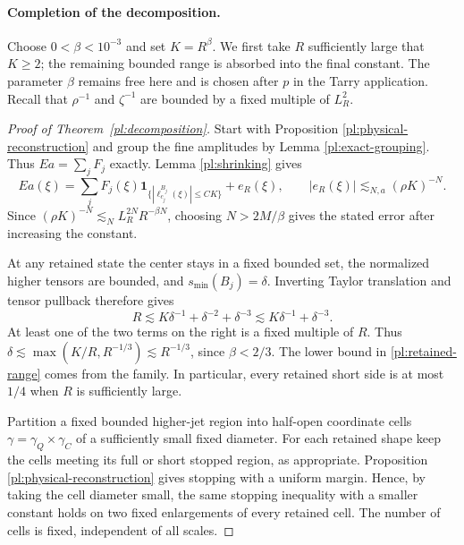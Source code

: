 \documentclass[11pt]{amsart}
\theoremstyle{definition}
\theoremstyle{remark}
\numberwithin{equation}{section}
\begin{document}
\paragraph{Completion of the decomposition.}
\label{pl:resolution-proof}

Choose $0<\beta<10^{-3}$ and set $K=R^\beta$. We first take $R$ sufficiently large that $K\ge2$; the remaining bounded range is absorbed into the final constant. The parameter $\beta$ remains free here and is chosen after $p$ in the Tarry application. Recall that $\rho^{-1}$ and $\zeta^{-1}$ are bounded by a fixed multiple of $L_R^2$.

\begin{proof}[Proof of Theorem~\ref{pl:decomposition}]
Start with Proposition \ref{pl:physical-reconstruction} and group the fine amplitudes by Lemma \ref{pl:exact-grouping}. Thus $Ea=\sum_jF_j$ exactly. Lemma \ref{pl:shrinking} gives
\[
Ea(\xi)=\sum_jF_j(\xi)\mathbf1_{\{|\ell_{c_j}^{B_j}(\xi)|\le CK\}}+e_R(\xi),
\qquad |e_R(\xi)|\lesssim_{N,a} (\rho K)^{-N}.
\]
Since $(\rho K)^{-N}\lesssim_N L_R^{2N}R^{-\beta N}$, choosing $N>2M/\beta$ gives the stated error after increasing the constant.

At any retained state the center stays in a fixed bounded set, the normalized higher tensors are bounded, and $s_{\min}(B_j)=\delta$. Inverting Taylor translation and tensor pullback therefore gives
\begin{equation}\label{pl:retained-scale}
R\lesssim K\delta^{-1}+\delta^{-2}+\delta^{-3}
\lesssim K\delta^{-1}+\delta^{-3}.
\end{equation}
At least one of the two terms on the right is a fixed multiple of $R$. Thus $\delta\lesssim\max(K/R,R^{-1/3})\lesssim R^{-1/3}$, since $\beta<2/3$. The lower bound in \eqref{pl:retained-range} comes from the family. In particular, every retained short side is at most $1/4$ when $R$ is sufficiently large.

Partition a fixed bounded higher-jet region into half-open coordinate cells $\gamma=\gamma_Q\times\gamma_C$ of a sufficiently small fixed diameter. For each retained shape keep the cells meeting its full or short stopped region, as appropriate. Proposition \ref{pl:physical-reconstruction} gives stopping with a uniform margin. Hence, by taking the cell diameter small, the same stopping inequality with a smaller constant holds on two fixed enlargements of every retained cell. The number of cells is fixed, independent of all scales.


\end{proof}
\end{document}
